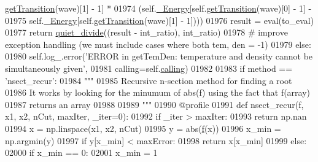 \begin{DoxyCode}
      \hyperlink{classpyneb_1_1core_1_1pynebcore_1_1_atom_a7c9f17a3d9e841267add92377d9d1ede}{getTransition}(wave)[1] - 1] * 
01974                                    (self.\hyperlink{classpyneb_1_1core_1_1pynebcore_1_1_atom_a52e68715246d258bf0a14f4bd06e89e4}{\_Energy}[self.\hyperlink{classpyneb_1_1core_1_1pynebcore_1_1_atom_a7c9f17a3d9e841267add92377d9d1ede}{getTransition}(wave)[0] - 1] - 
01975                                     self.\hyperlink{classpyneb_1_1core_1_1pynebcore_1_1_atom_a52e68715246d258bf0a14f4bd06e89e4}{\_Energy}[self.\hyperlink{classpyneb_1_1core_1_1pynebcore_1_1_atom_a7c9f17a3d9e841267add92377d9d1ede}{getTransition}(wave)[1] - 1])))
01976                 result = eval(to\_eval)
01977                 \textcolor{keywordflow}{return} \hyperlink{namespacepyneb_1_1utils_1_1misc_a852d66d22ba9e872484b3346dc28249e}{quiet\_divide}((result - int\_ratio), int\_ratio)
01978         \textcolor{comment}{# improve exception handling (we must include cases where both tem, den = -1) }
01979         \textcolor{keywordflow}{else}:
01980             self.log\_.error(\textcolor{stringliteral}{'ERROR in getTemDen: temperature and density cannot be simultaneously given'},
01981                             calling=self.\hyperlink{classpyneb_1_1core_1_1pynebcore_1_1_atom_a373b7735acf4f528b54bddf373ad67a1}{calling})
01982 
01983         \textcolor{keywordflow}{if} method == \textcolor{stringliteral}{'nsect\_recur'}:
01984             \textcolor{stringliteral}{"""}
01985 \textcolor{stringliteral}{            Recursive n-section method for finding a root}
01986 \textcolor{stringliteral}{            It works by looking for the minumum of abs(f) using the fact that f(array) }
01987 \textcolor{stringliteral}{                returns an array}
01988 \textcolor{stringliteral}{}
01989 \textcolor{stringliteral}{            """}
01990             @profile
01991             \textcolor{keyword}{def }nsect\_recur(f, x1, x2, nCut, maxIter, \_iter=0):
01992                 \textcolor{keywordflow}{if} \_iter > maxIter:
01993                     \textcolor{keywordflow}{return} np.nan
01994                 x = np.linspace(x1, x2, nCut)
01995                 y = abs(\hyperlink{namespacepyneb_1_1utils_1_1_fortran_format_af94352584eced016c14d524330879115}{f}(x))
01996                 x\_min = np.argmin(y)
01997                 \textcolor{keywordflow}{if} y[x\_min] < maxError:
01998                     \textcolor{keywordflow}{return} x[x\_min]
01999                 \textcolor{keywordflow}{else}:
02000                     \textcolor{keywordflow}{if} x\_min == 0:
02001                         x\_min = 1

\end{DoxyCode}
